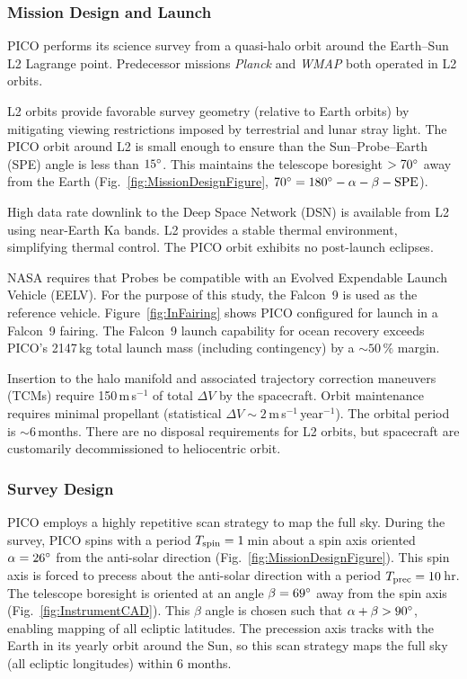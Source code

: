 \subsubsection{Mission Design and Launch}
\label{sec:mission_design} %

PICO performs its science survey from a quasi-halo orbit around the
Earth--Sun L2 Lagrange point. Predecessor missions \textit{Planck} and
\textit{WMAP} both operated in L2 orbits.

L2 orbits provide favorable survey geometry (relative to Earth orbits)
by mitigating viewing restrictions imposed by terrestrial and lunar
stray light. The PICO orbit around L2 is small enough to ensure than
the Sun--Probe--Earth (SPE) angle is less than $15^\circ$. This
maintains the telescope boresight $>70^\circ$ away from the Earth
(Fig.~\ref{fig:MissionDesignFigure},
$70^\circ = 180^\circ -\alpha - \beta - \rm{SPE}$). 



High data rate downlink to the Deep Space Network (DSN) is available
from L2 using near-Earth Ka bands. L2 provides a stable thermal
environment, simplifying thermal control. The PICO orbit exhibits no
post-launch eclipses.
 
NASA requires that Probes be compatible with an Evolved Expendable
Launch Vehicle (EELV). For the purpose of this study, the Falcon~9
\citep{SpaceX2015} is used as the reference
vehicle. Figure~\ref{fig:InFairing} shows PICO configured for launch
in a Falcon~9 fairing. The Falcon~9 launch capability for ocean
recovery exceeds PICO's 2147\,kg total launch mass (including contingency) by a
$\sim 50\,\%$ margin.

Insertion to the halo manifold and associated trajectory correction
maneuvers (TCMs) require 150\,m\,s$^{-1}$ of total $\Delta V$ by the
spacecraft. Orbit maintenance requires minimal propellant (statistical
$\Delta V\sim 2$\,m\,s$^{-1}$\,year$^{-1}$). The orbital period is $\sim6$\,months. 
There are no disposal requirements for L2 orbits, but spacecraft are customarily
decommissioned to heliocentric orbit.


\subsubsection{Survey Design}
\label{sec:survey_design} %
 
PICO employs a highly repetitive scan strategy to map the full
sky. During the survey, PICO spins with a period
$T_{\rm spin} = 1$\,min about a spin axis oriented $\alpha=26^\circ$
from the anti-solar direction (Fig.~\ref{fig:MissionDesignFigure}). This spin axis
is forced to precess about the anti-solar direction with a period
$T_{\rm prec}= 10$\,hr. The telescope boresight is oriented at an
angle $\beta=69^\circ$ away from the spin axis (Fig.~\ref{fig:InstrumentCAD}). This $\beta$ angle is
chosen such that $\alpha + \beta > 90^\circ$, enabling mapping of all
ecliptic latitudes. The precession axis tracks with the Earth in its
yearly orbit around the Sun, so this scan strategy maps the full sky
(all ecliptic longitudes) within 6 months.

